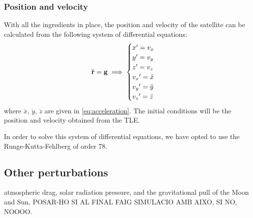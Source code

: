 \documentclass[../main.tex]{subfiles}
\begin{document}
\subsubsection{Position and velocity}
With all the ingredients in place, the position and velocity of the satellite can be calculated from the following system of differential equations:
$$
  \ddot{\boldsymbol{\mathrm{r}}}=\boldsymbol{\mathrm{g}}
  \implies
  \begin{cases}
    x'=v_x          \\
    y'=v_y          \\
    z'=v_z          \\
    {v_x}'=\ddot{x} \\
    {v_y}'=\ddot{y} \\
    {v_z}'=\ddot{z}
  \end{cases}
$$
where $\ddot{x}$, $\ddot{y}$, $\ddot{z}$ are given in \cref{eq:acceleration}. The initial conditions will be the position and velocity obtained from the TLE.

In order to solve this system of differential equations, we have opted to use the Runge-Kutta-Fehlberg of order 78.
\subsection{Other perturbations}
atmospheric drag, solar radiation pressure, and the gravitational pull of the Moon and Sun,
POSAR-HO SI AL FINAL FAIG SIMULACIO AMB AIXO, SI NO, NOOOO.

\end{document}
